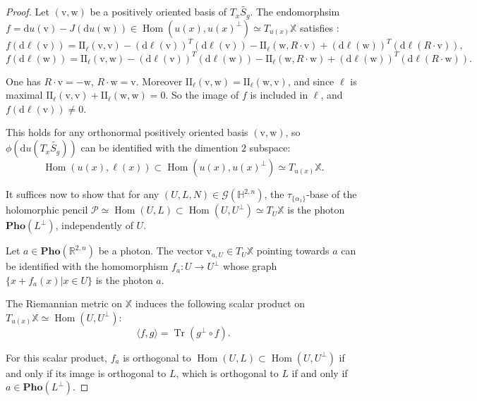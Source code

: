 \documentclass[reqno,10pt]{amsart}
\theoremstyle{plain}
\theoremstyle{definition}
\theoremstyle{remark}
\newcommand{\type}{\tau}
\newcommand{\R}{\mathbb{R}}
\newcommand{\transpose}[1]{\ensuremath{#1^{\scriptscriptstyle T}}}
\DeclareMathOperator{\tr}{Tr}
\DeclareMathOperator{\Hom}{Hom}
\newcommand{\II}{\mathrm{I\!I}}
\newcommand{\Pho}{\mathbf{Pho}}
\newcommand{\X}{\mathbb{X}}
\begin{document}
\begin{proof}
\medskip

Let $(\mathrm{v},\mathrm{w})$ be a positively oriented basis of $T_x\widetilde{S_g}$. The endomorphsim $f=\mathrm{d}u(\mathrm{v})-J(\mathrm{d}u(\mathrm{w}))\in \Hom(u(x),u(x)^\perp)\simeq T_{u(x)}\X$ satisfies :
$$f\left(\mathrm{d}\ell(\mathrm{v})\right)= \II_\ell(\mathrm{v},\mathrm{v})-\transpose{\left(\mathrm{d}\ell(\mathrm{v})\right)}\left(\mathrm{d}\ell(\mathrm{v})\right)- 
\II_\ell(\mathrm{w},R\cdot\mathrm{v})+\transpose{\left(\mathrm{d}\ell(\mathrm{w})\right)}\left(\mathrm{d}\ell\left(R\cdot\mathrm{v}\right)\right), $$
$$f\left(\mathrm{d}\ell(\mathrm{w})\right)= \II_\ell(\mathrm{v},\mathrm{w})-\transpose{\left(\mathrm{d}\ell(\mathrm{v})\right)}\left(\mathrm{d}\ell(\mathrm{w})\right)- 
\II_\ell(\mathrm{w},R\cdot\mathrm{w})+\transpose{\left(\mathrm{d}\ell(\mathrm{w})\right)}\left(\mathrm{d}\ell(R\cdot\mathrm{w})\right). $$

One has $R\cdot\mathrm{v}=-\mathrm{w}$, $R\cdot\mathrm{w}=\mathrm{v}$. Moreover $\II_\ell(\mathrm{v},\mathrm{w})=\II_\ell(\mathrm{w},\mathrm{v})$, and since $\ell$ is maximal $\II_\ell(\mathrm{v},\mathrm{v})+\II_\ell(\mathrm{w},\mathrm{w})=0$. So the image of $f$ is included in $\ell$, and $f\left(\mathrm{d}\ell(\mathrm{v})\right)\neq 0$.

\medskip

This holds for any orthonormal positively oriented basis  $(\mathrm{v},\mathrm{w})$, so $\phi(\mathrm{d}u(T_x\widetilde{S_g}))$ can be identified with the dimention $2$ subspace:
$$\Hom\left(u(x),\ell(x)\right)\subset\Hom\left(u(x),u(x)^\perp\right)\simeq T_{u(x)}\X.$$

It suffices now to show that for any $(U,L,N)\in \mathcal{G}(\mathbb{H}^{2,n})$, the $\type_{\lbrace\alpha_1\rbrace}$-base of the holomorphic pencil $\mathcal{P}\simeq\Hom\left(U,L\right)\subset\Hom(U, U^\perp)\simeq T_U\X$ is the photon $\Pho(L^\perp)$, independently of $U$.

\medskip

Let $a\in \Pho(\R^{2,n})$ be a photon. The vector $\mathrm{v}_{a,U}\in T_{U}\X$ pointing towards $a$ can be identified with the homomorphism $f_a:U\to U^\perp$ whose graph $\lbrace x+f_a(x)|x\in U\rbrace$ is the photon $a$.

\medskip

The Riemannian metric on $\X$ induces the following scalar product on $T_{u(x)}\X\simeq \Hom\left(U,U^\perp\right)$:
$$\langle f, g\rangle=\tr(g^\perp\circ f).$$

For this scalar product, $f_a$ is orthogonal to $\Hom\left(U,L\right)\subset \Hom\left(U, U^\perp\right)$ if and only if its image is orthogonal to $L$, which is orthogonal to $L$ if and only if $a\in \Pho(L^\perp)$.


\end{proof}
\end{document}
